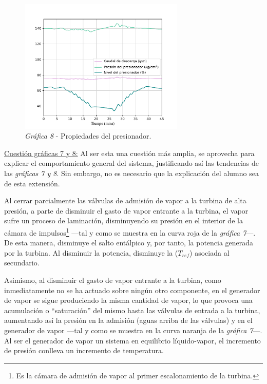 \begin{figure}[!h]
  \centering
  \includegraphics[width=0.7\textwidth]{content/figures/sim1_presionador.pdf}
  \caption{\textit{Gráfica 8} - Propiedades del presionador.}
  \label{fig:sim1_presionador}
\end{figure}

\underline{Cuestión gráficas 7 y 8:} Al ser esta una cuestión más amplia, se aprovecha para explicar el comportamiento general del sistema, justificando así las tendencias de las \textit{gráficas 7 y 8}. Sin embargo, no es necesario que la explicación del alumno sea de esta extensión.

Al cerrar parcialmente las válvulas de admisión de vapor a la turbina de alta presión, a parte de disminuir el gasto de vapor entrante a la turbina, el vapor sufre un proceso de laminación, disminuyendo su presión en el interior de la cámara de impulsos\footnote{Es la cámara de admisión de vapor al primer escalonamiento de la turbina.} ---tal y como se muestra en la curva roja de la \textit{gráfica 7}---. De esta manera, disminuye el salto entálpico y, por tanto, la potencia generada por la turbina. Al disminuir la potencia, disminuye la ($T_{ref}$) asociada al secundario.

Asimismo, al disminuir el gasto de vapor entrante a la turbina, como inmediatamente no se ha actuado sobre ningún otro componente, en el generador de vapor se sigue produciendo la misma cantidad de vapor, lo que provoca una acumulación o ``saturación'' del mismo hasta las válvulas de entrada a la turbina, aumentando así la presión en la admisión (aguas arriba de las válvulas) y en el generador de vapor ---tal y como se muestra en la curva naranja de la \textit{gráfica 7}---. Al ser el generador de vapor un sistema en equilibrio líquido-vapor, el incremento de presión conlleva un incremento de temperatura.

